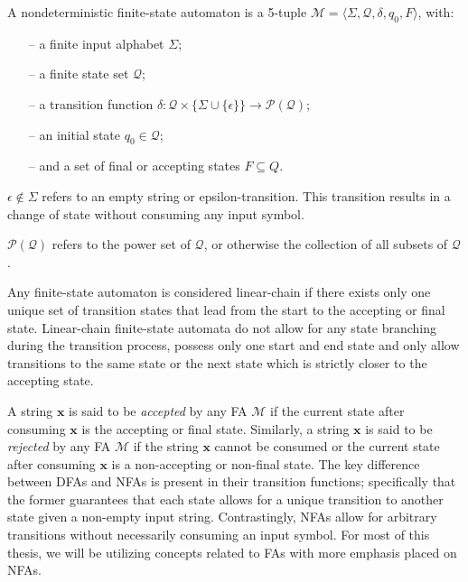 \begin{definition}
  \label{def:nd-fsa}
  A nondeterministic finite-state automaton is a 5-tuple $\mathcal{M} = \langle \Sigma, \mathcal{Q}, \delta, q_0, F \rangle$, with:
  \begin{itemize}
    \itemsep0em 
    \item[--] a finite input alphabet $\Sigma$;
    \item[--] a finite state set $\mathcal{Q}$;
    \item[--] a transition function $\delta: \mathcal{Q} \times \{\Sigma \cup \{\epsilon\}\} \rightarrow \mathcal{P}(\mathcal{Q})$;
    \item[--] an initial state $q_0 \in \mathcal{Q}$; 
    \item[--] and a set of final or accepting states $F \subseteq Q$.
  \end{itemize}

  \begin{remark}
    $\epsilon \notin \Sigma$ refers to an empty string or epsilon-transition. This transition results in a change of state without consuming any input symbol.
  \end{remark}

  \begin{remark}
    $\mathcal{P}(\mathcal{Q})$ refers to the power set of $\mathcal{Q}$, or otherwise the collection of all subsets of $\mathcal{Q}$.
  \end{remark}
\end{definition}

\begin{definition}
  Any finite-state automaton is considered linear-chain if there exists only one unique set of transition states that lead from the start to the accepting or final state. Linear-chain finite-state automata do not allow for any state branching during the transition process, possess only one start and end state and only allow transitions to the same state or the next state which is strictly closer to the accepting state.
\end{definition}

A string $\pmb{x}$ is said to be \textit{accepted} by any FA $\mathcal{M}$ if the current state after consuming $\pmb{x}$ is the accepting or final state. Similarly, a string $\pmb{x}$ is said to be \textit{rejected} by any FA $\mathcal{M}$ if the string $\pmb{x}$ cannot be consumed or the current state after consuming $\pmb{x}$ is a non-accepting or non-final state. The key difference between DFAs and NFAs is present in their transition functions; specifically that the former guarantees that each state allows for a unique transition to another state given a non-empty input string. Contrastingly, NFAs allow for arbitrary transitions without necessarily consuming an input symbol. For most of this thesis, we will be utilizing concepts related to FAs with more emphasis placed on NFAs.

